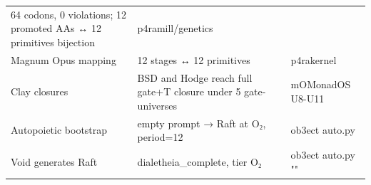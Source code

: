 \documentclass[12pt,a4paper]{article}
\begin{document}
\begin{longtable}[]{@{}lll@{}}
\begin{minipage}[t]{0.28\columnwidth}
64 codons, 0 violations; 12 promoted AAs ↔ 12 primitives bijection\strut
\end{minipage} & \begin{minipage}[t]{0.32\columnwidth}\raggedright
p4ramill/genetics\strut
\end{minipage}\tabularnewline
\begin{minipage}[t]{0.32\columnwidth}\raggedright
Magnum Opus mapping\strut
\end{minipage} & \begin{minipage}[t]{0.28\columnwidth}\raggedright
12 stages ↔ 12 primitives\strut
\end{minipage} & \begin{minipage}[t]{0.32\columnwidth}\raggedright
p4rakernel\strut
\end{minipage}\tabularnewline
\begin{minipage}[t]{0.32\columnwidth}\raggedright
Clay closures\strut
\end{minipage} & \begin{minipage}[t]{0.28\columnwidth}\raggedright
BSD and Hodge reach full gate+T closure under 5 gate-universes\strut
\end{minipage} & \begin{minipage}[t]{0.32\columnwidth}\raggedright
mOMonadOS U8-U11\strut
\end{minipage}\tabularnewline
\begin{minipage}[t]{0.32\columnwidth}\raggedright
Autopoietic bootstrap\strut
\end{minipage} & \begin{minipage}[t]{0.28\columnwidth}\raggedright
empty prompt → Raft at O₂, period=12\strut
\end{minipage} & \begin{minipage}[t]{0.32\columnwidth}\raggedright
ob3ect auto.py\strut
\end{minipage}\tabularnewline
\begin{minipage}[t]{0.32\columnwidth}\raggedright
Void generates Raft\strut
\end{minipage} & \begin{minipage}[t]{0.28\columnwidth}\raggedright
dialetheia\_complete, tier O₂\strut
\end{minipage} & \begin{minipage}[t]{0.32\columnwidth}\raggedright
ob3ect auto.py ""\strut
\end{minipage}\tabularnewline
\bottomrule
\end{longtable}
\end{document}
